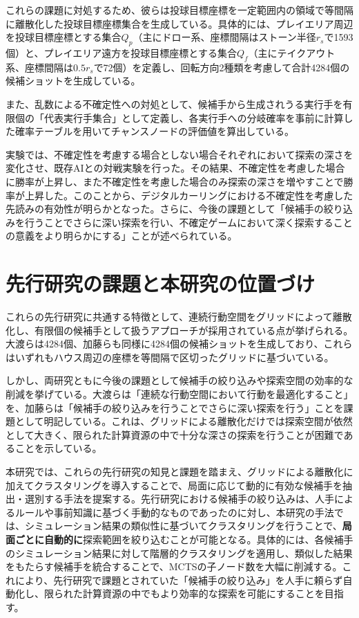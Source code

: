 \documentclass[11pt,a4j]{jreport}
\begin{document}
これらの課題に対処するため、彼らは投球目標座標を一定範囲内の領域で等間隔に離散化した投球目標座標集合を生成している。具体的には、プレイエリア周辺を投球目標座標とする集合$Q_p$（主にドロー系、座標間隔はストーン半径$r_s$で1593個）と、プレイエリア遠方を投球目標座標とする集合$Q_f$（主にテイクアウト系、座標間隔は$0.5r_s$で72個）を定義し、回転方向2種類を考慮して合計4284個の候補ショットを生成している。

また、乱数による不確定性への対処として、候補手から生成されうる実行手を有限個の「代表実行手集合」として定義し、各実行手への分岐確率を事前に計算した確率テーブルを用いてチャンスノードの評価値を算出している。

実験では、不確定性を考慮する場合としない場合それぞれにおいて探索の深さを変化させ、既存AIとの対戦実験を行った。その結果、不確定性を考慮した場合に勝率が上昇し、また不確定性を考慮した場合のみ探索の深さを増やすことで勝率が上昇した。このことから、デジタルカーリングにおける不確定性を考慮した先読みの有効性が明らかとなった。さらに、今後の課題として「候補手の絞り込みを行うことでさらに深い探索を行い、不確定ゲームにおいて深く探索することの意義をより明らかにする」ことが述べられている。

\section[課題と本研究の位置づけ]{先行研究の課題と本研究の位置づけ}
これらの先行研究に共通する特徴として、連続行動空間をグリッドによって離散化し、有限個の候補手として扱うアプローチが採用されている点が挙げられる。大渡らは4284個、加藤らも同様に4284個の候補ショットを生成しており、これらはいずれもハウス周辺の座標を等間隔で区切ったグリッドに基づいている。

しかし、両研究ともに今後の課題として候補手の絞り込みや探索空間の効率的な削減を挙げている。大渡らは「連続な行動空間において行動を最適化すること」を、加藤らは「候補手の絞り込みを行うことでさらに深い探索を行う」ことを課題として明記している。これは、グリッドによる離散化だけでは探索空間が依然として大きく、限られた計算資源の中で十分な深さの探索を行うことが困難であることを示している。

本研究では、これらの先行研究の知見と課題を踏まえ、グリッドによる離散化に加えてクラスタリングを導入することで、局面に応じて動的に有効な候補手を抽出・選別する手法を提案する。先行研究における候補手の絞り込みは、人手によるルールや事前知識に基づく手動的なものであったのに対し、本研究の手法では、シミュレーション結果の類似性に基づいてクラスタリングを行うことで、\textbf{局面ごとに自動的に}探索範囲を絞り込むことが可能となる。具体的には、各候補手のシミュレーション結果に対して階層的クラスタリングを適用し、類似した結果をもたらす候補手を統合することで、MCTSの子ノード数を大幅に削減する。これにより、先行研究で課題とされていた「候補手の絞り込み」を人手に頼らず自動化し、限られた計算資源の中でもより効率的な探索を可能にすることを目指す。
\end{document}
